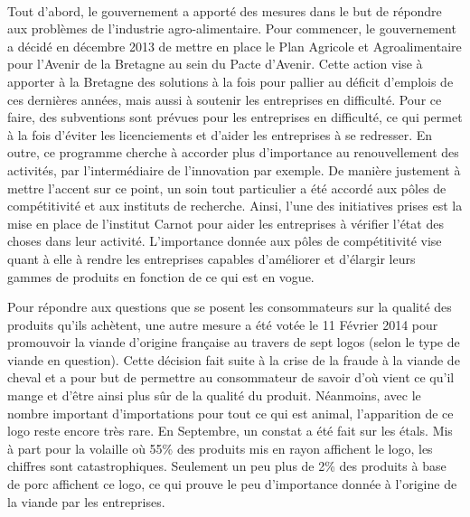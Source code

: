 \documentclass[a4paper,10pt]{report}
\begin{document}
			\paragraph{}Tout d’abord, le gouvernement a apporté des mesures dans le but de répondre aux problèmes de l’industrie agro-alimentaire. Pour commencer, le gouvernement a décidé en décembre 2013 de mettre en place le Plan Agricole et Agroalimentaire pour l’Avenir de la Bretagne au sein du Pacte d’Avenir\cite{PacteAvenirBretagne}. Cette action vise à apporter à la Bretagne des solutions à la fois pour pallier au déficit d’emplois de ces dernières années, mais aussi à soutenir les entreprises en difficulté. Pour ce faire, des subventions sont prévues pour les entreprises en difficulté, ce qui permet à la fois d’éviter les licenciements et d’aider les entreprises à se redresser. En outre, ce programme cherche à accorder plus d’importance au renouvellement des activités, par l’intermédiaire de l’innovation par exemple. De manière justement à mettre l’accent sur ce point, un soin tout particulier a été accordé aux pôles de compétitivité et aux instituts de recherche. Ainsi, l'une des initiatives prises est la mise en place de l’institut Carnot pour aider les entreprises à vérifier l’état des choses dans leur activité. L’importance donnée aux pôles de compétitivité vise quant à elle à rendre les entreprises capables d’améliorer et d’élargir leurs gammes de produits en fonction de ce qui est en vogue.

			Pour répondre aux questions que se posent les consommateurs sur la qualité des produits qu’ils achètent, une autre mesure a été votée le 11 Février 2014 pour promouvoir la viande d’origine française au travers de sept logos (selon le type de viande en question). Cette décision fait suite à la crise de la fraude à la viande de cheval et a pour but de permettre au consommateur de savoir d’où vient ce qu’il mange et d’être ainsi plus sûr de la qualité du produit. Néanmoins, avec le nombre important d’importations pour tout ce qui est animal, l’apparition de ce logo reste encore très rare. En Septembre, un constat a été fait sur les étals. Mis à part pour la volaille où 55\% des produits mis en rayon affichent le logo, les chiffres sont catastrophiques. Seulement un peu plus de 2\% des produits à base de porc affichent ce logo, ce qui prouve le peu d’importance donnée à l’origine de la viande par les entreprises\cite{FlopVDF}.

\end{document}

